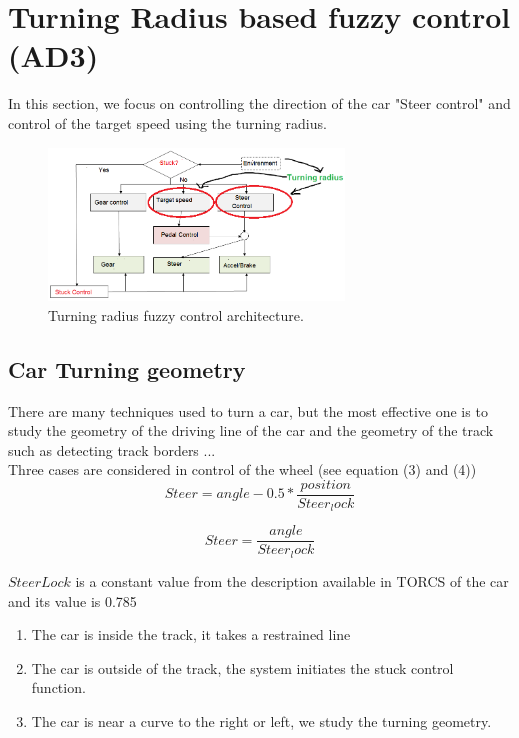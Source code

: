 \documentclass{llncs}
\begin{document}
\section{{\color{red}Turning Radius based fuzzy control (AD3) }}


In this section, we focus on controlling the direction of the car "Steer control" and control of the target speed using the turning radius.
\begin{figure}[h!]
	
	\centering
	\includegraphics[width=0.7\textwidth]{fig/steercible3.PNG}
	\begin{minipage}{10cm}
		\centering
		\caption{\footnotesize Turning radius fuzzy control architecture.}
		\label{fig45}
	\end{minipage} 
\end{figure}
\subsection{Car Turning geometry }	
There are many techniques used to turn a car, but the most effective one is to study the geometry of the driving line of the car and the geometry of the track such as detecting track borders ... \\

Three cases are considered in control of the wheel (see equation (3) and (4)) \\

\begin{equation}
Steer =  angle - 0.5 *\frac{position }{Steer_lock}		
\end{equation}

\begin{equation}
Steer =  \frac{angle }{Steer_lock}	
\end{equation}

$SteerLock $ is a constant value  from the description available in TORCS of the car  and its value is 0.785		
\begin{enumerate}
	\item  The car is inside the track, it takes a restrained line \\
	\item  The car is outside of the track, the system initiates the stuck control function.\\
	\item  The car is near a curve to the right or left, we study the turning geometry. \\	
\end{enumerate}	
\end{document}
